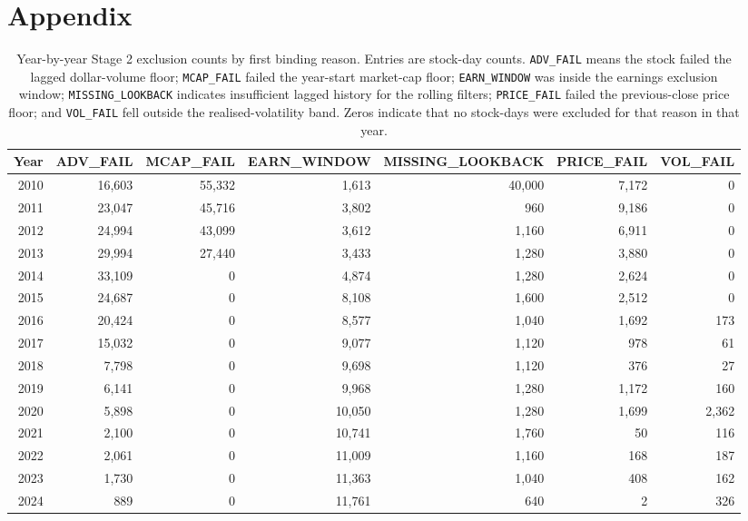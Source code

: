 \section{Appendix}
\begin{table}[htbp]
\centering
\scriptsize
\begin{tabular}{rrrrrrr}
\hline
Year & ADV\_FAIL & MCAP\_FAIL & EARN\_WINDOW & MISSING\_LOOKBACK & PRICE\_FAIL & VOL\_FAIL \\
\hline
2010 & 16,603 & 55,332 & 1,613 & 40,000 & 7,172 & 0 \\
2011 & 23,047 & 45,716 & 3,802 & 960 & 9,186 & 0 \\
2012 & 24,994 & 43,099 & 3,612 & 1,160 & 6,911 & 0 \\
2013 & 29,994 & 27,440 & 3,433 & 1,280 & 3,880 & 0 \\
2014 & 33,109 & 0 & 4,874 & 1,280 & 2,624 & 0 \\
2015 & 24,687 & 0 & 8,108 & 1,600 & 2,512 & 0 \\
2016 & 20,424 & 0 & 8,577 & 1,040 & 1,692 & 173 \\
2017 & 15,032 & 0 & 9,077 & 1,120 & 978 & 61 \\
2018 & 7,798 & 0 & 9,698 & 1,120 & 376 & 27 \\
2019 & 6,141 & 0 & 9,968 & 1,280 & 1,172 & 160 \\
2020 & 5,898 & 0 & 10,050 & 1,280 & 1,699 & 2,362 \\
2021 & 2,100 & 0 & 10,741 & 1,760 & 50 & 116 \\
2022 & 2,061 & 0 & 11,009 & 1,160 & 168 & 187 \\
2023 & 1,730 & 0 & 11,363 & 1,040 & 408 & 162 \\
2024 & 889 & 0 & 11,761 & 640 & 2 & 326 \\
\hline
\end{tabular}
\caption{Year-by-year Stage 2 exclusion counts by first binding reason. Entries are stock-day counts. \texttt{ADV\_FAIL} means the stock failed the lagged dollar-volume floor; \texttt{MCAP\_FAIL} failed the year-start market-cap floor; \texttt{EARN\_WINDOW} was inside the earnings exclusion window; \texttt{MISSING\_LOOKBACK} indicates insufficient lagged history for the rolling filters; \texttt{PRICE\_FAIL} failed the previous-close price floor; and \texttt{VOL\_FAIL} fell outside the realised-volatility band. Zeros indicate that no stock-days were excluded for that reason in that year.}
\label{tab:stage2_reason_by_year}
\end{table}